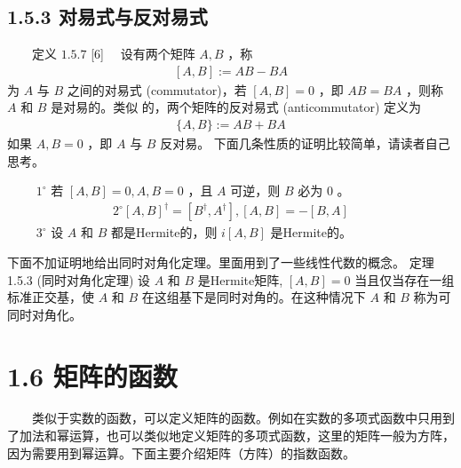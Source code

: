 \documentclass[a4paper,11pt,english]{sphinxmanual}
\begin{document}
\subsection{1.5.3 对易式与反对易式}
\label{\detokenize{rst/_u9644_u5f551_u91cf_u5b50_u8ba1_u7b97_u6570_u5b66_u57fa_u78404:id3}}
\sphinxAtStartPar
​  定义  \(1.5.7\)  {[}6{]}  设有两个矩阵  \(A, B\)  ，称
\begin{equation*}
\begin{split}[A, B]:=A B-B A\end{split}
\end{equation*}
\sphinxAtStartPar
为  \(A\)  与  \(B\)  之间的对易式 (commutator)，若  \([A, B]=0\)  ，即  \(A B=B A\)  ，则称  \(A\)  和  \(B\)  是对易的。类似 的，两个矩阵的反对易式 (anti\sphinxhyphen{}commutator) 定义为
\begin{equation*}
\begin{split}\{A, B\}:=A B+B A\end{split}
\end{equation*}
\sphinxAtStartPar
如果  \({A, B}=0\)  ，即  \(A\)  与  \(B\)  反对易。 下面几条性质的证明比较简单，请读者自己思考。

\sphinxAtStartPar
   \(1^{\circ}\)  若  \([A, B]=0,{A, B}=0\)  ，且  \(A\)  可逆，则  \(B\)  必为 0 。
\begin{equation*}
\begin{split}2^{\circ}[A, B]^{\dagger}=\left[B^{\dagger}, A^{\dagger}\right],[A, B]=-[B, A]\end{split}
\end{equation*}
\sphinxAtStartPar
   \(3^{\circ}\)  设  \(A\) 和 \(B\)  都是Hermite的，则  \(i[A, B]\)  是Hermite的。

\sphinxAtStartPar
下面不加证明地给出同时对角化定理。里面用到了一些线性代数的概念。 定理 1.5.3 (同时对角化定理) 设  \(A\)  和  \(B\)  是Hermite矩阵,  \([A, B]=0\)  当且仅当存在一组标准正交基，使  \(A\) 和 \(B\)  在这组基下是同时对角的。在这种情况下  \(A\) 和 \(B\)  称为可同时对角化。

\sphinxstepscope


\section{1.6 矩阵的函数}
\label{\detokenize{rst/_u9644_u5f551_u91cf_u5b50_u8ba1_u7b97_u6570_u5b66_u57fa_u78405:id1}}\label{\detokenize{rst/_u9644_u5f551_u91cf_u5b50_u8ba1_u7b97_u6570_u5b66_u57fa_u78405::doc}}
\sphinxAtStartPar
​  类似于实数的函数，可以定义矩阵的函数。例如在实数的多项式函数中只用到了加法和幂运算，也可以类似地定义矩阵的多项式函数，这里的矩阵一般为方阵，因为需要用到幂运算。下面主要介绍矩阵（方阵）的指数函数。
\end{document}
